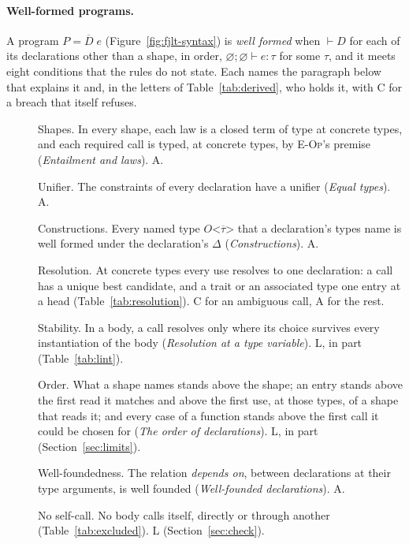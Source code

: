 \paragraph{Well-formed programs.}
\label{app:fjlt:wf}
A program $P = \overline{D}\; e$ (Figure~\ref{fig:fjlt-syntax}) is \emph{well formed} when $\vdash D$ for each of its declarations other than a shape, in order, $\varnothing; \varnothing \vdash e : \tau$ for some $\tau$, and it meets eight conditions that the rules do not state.
Each names the paragraph below that explains it and, in the letters of Table~\ref{tab:derived}, who holds it, with C for a breach that \Cpp{} itself refuses.
\begin{description}
\item[\thewf\label{wf:shapes}] Shapes. In every shape, each law is a closed term of type  at concrete types, and each required call is typed, at concrete types, by \textsc{E-Op}'s premise (\emph{Entailment and laws}). A.
\item[\thewf\label{wf:unifier}] Unifier. The  constraints of every declaration have a unifier (\emph{Equal types}). A.
\item[\thewf\label{wf:construct}] Constructions. Every named type $O\texttt{<}\overline{\tau}\texttt{>}$ that a declaration's types name is well formed under the declaration's $\Delta$ (\emph{Constructions}). A.
\item[\thewf\label{wf:function}] Resolution. At concrete types every use resolves to one declaration: a call has a unique best candidate, and a trait or an associated type one entry at a head (Table~\ref{tab:resolution}). C for an ambiguous call, A for the rest.
\item[\thewf\label{wf:stable}] Stability. In a body, a call resolves only where its choice survives every instantiation of the body (\emph{Resolution at a type variable}). L, in part (Table~\ref{tab:lint}).
\item[\thewf\label{wf:order}] Order. What a shape names stands above the shape; an entry stands above the first read it matches and above the first use, at those types, of a shape that reads it; and every case of a function stands above the first call it could be chosen for (\emph{The order of declarations}). L, in part (Section~\ref{sec:limits}).
\item[\thewf\label{wf:founded}] Well-foundedness. The relation \emph{depends on}, between declarations at their type arguments, is well founded (\emph{Well-founded declarations}). A.
\item[\thewf\label{wf:acyclic}] No self-call. No body calls itself, directly or through another (Table~\ref{tab:excluded}). L (Section~\ref{sec:check}).
\end{description}


